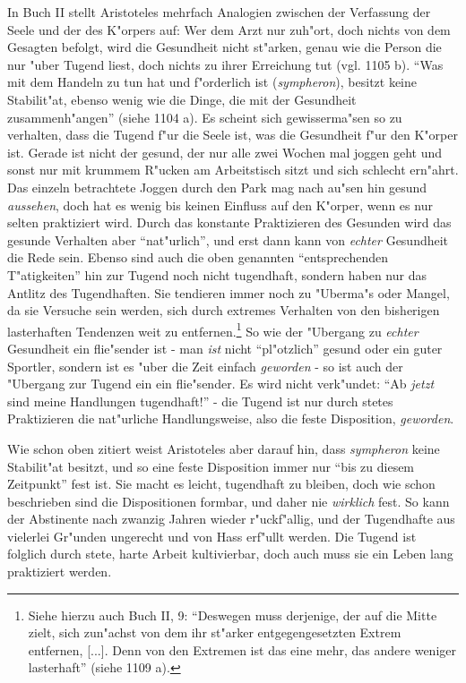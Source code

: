 \documentclass[a4paper, emulatestandardclasses, 12pt]{scrartcl}
\begin{document}
\begin{onehalfspace}
In Buch II stellt Aristoteles mehrfach Analogien zwischen der Verfassung der Seele und der des K"orpers auf: Wer dem Arzt nur zuh"ort, doch nichts von dem Gesagten befolgt, wird die Gesundheit nicht st"arken, genau wie die Person die nur "uber Tugend liest, doch nichts zu ihrer Erreichung tut (vgl. 1105 b). "`Was mit dem Handeln zu tun hat und f"orderlich ist (\emph{sympheron}), besitzt keine Stabilit"at, ebenso wenig wie die Dinge, die mit der Gesundheit zusammenh"angen"' (siehe 1104 a). Es scheint sich gewisserma"sen so zu verhalten, dass die Tugend f"ur die Seele ist, was die Gesundheit f"ur den K"orper ist. Gerade ist nicht der gesund, der nur alle zwei Wochen mal joggen geht und sonst nur mit krummem R"ucken am Arbeitstisch sitzt und sich schlecht ern"ahrt. Das einzeln betrachtete Joggen durch den Park mag nach au"sen hin gesund \emph{aussehen}, doch hat es wenig bis keinen Einfluss auf den K"orper, wenn es nur selten praktiziert wird. Durch das konstante Praktizieren des Gesunden wird das gesunde Verhalten aber "`nat"urlich"', und erst dann kann von \emph{echter} Gesundheit die Rede sein. Ebenso sind auch die oben genannten "`entsprechenden T"atigkeiten"' hin zur Tugend noch nicht tugendhaft, sondern haben nur das Antlitz des Tugendhaften. Sie tendieren immer noch zu "Uberma"s oder Mangel, da sie Versuche sein werden, sich durch extremes Verhalten von den bisherigen lasterhaften Tendenzen weit zu entfernen.\footnote{Siehe hierzu auch Buch II, 9: "`Deswegen muss derjenige, der auf die Mitte zielt, sich zun"achst von dem ihr st"arker entgegengesetzten Extrem entfernen, [...]. Denn von den Extremen ist das eine mehr, das andere weniger lasterhaft"' (siehe 1109 a).} So wie der "Ubergang zu \emph{echter} Gesundheit ein flie"sender ist - man \emph{ist} nicht "`pl"otzlich"' gesund oder ein guter Sportler, sondern ist es "uber die Zeit einfach \emph{geworden} - so ist auch der "Ubergang zur Tugend ein ein flie"sender. Es wird nicht verk"undet: "`Ab \emph{jetzt} sind meine Handlungen tugendhaft!"' - die Tugend ist nur durch stetes Praktizieren die nat"urliche Handlungsweise, also die feste Disposition, \emph{geworden}.

Wie schon oben zitiert weist Aristoteles aber darauf hin, dass \emph{sympheron} keine Stabilit"at besitzt, und so eine feste Disposition immer nur "`bis zu diesem Zeitpunkt"' fest ist. Sie macht es leicht, tugendhaft zu bleiben, doch wie schon beschrieben sind die Dispositionen formbar, und daher nie \emph{wirklich} fest. So kann der Abstinente nach zwanzig Jahren wieder r"uckf"allig, und der Tugendhafte aus vielerlei Gr"unden ungerecht und von Hass erf"ullt werden. Die Tugend ist folglich durch stete, harte Arbeit kultivierbar, doch auch muss sie ein Leben lang praktiziert werden.


\end{onehalfspace}
\end{document}
